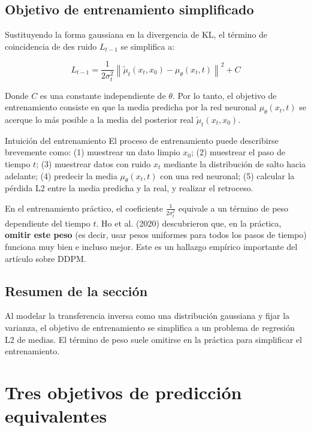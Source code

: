 \documentclass[a4paper]{article}
\begin{document}
\subsection{Objetivo de entrenamiento simplificado}

Sustituyendo la forma gaussiana en la divergencia de KL, el término de coincidencia de des ruido $L_{t-1}$ se simplifica a:

$$L_{t-1} = \frac{1}{2\sigma_t^2} \left\| \tilde{\mu}_t(x_t, x_0) - \mu_\theta(x_t, t) \right\|^2 + C$$

Donde $C$ es una constante independiente de $\theta$. Por lo tanto, el objetivo de entrenamiento consiste en que la media predicha por la red neuronal $\mu_\theta(x_t, t)$ se acerque lo más posible a la media del posterior real $\tilde{\mu}_t(x_t, x_0)$.

\begin{importantbox}{Intuición del entrenamiento}
El proceso de entrenamiento puede describirse brevemente como: (1) muestrear un dato limpio $x_0$; (2) muestrear el paso de tiempo $t$; (3) muestrear datos con ruido $x_t$ mediante la distribución de salto hacia adelante; (4) predecir la media $\mu_\theta(x_t, t)$ con una red neuronal; (5) calcular la pérdida L2 entre la media predicha y la real, y realizar el retroceso.
\end{importantbox}

En el entrenamiento práctico, el coeficiente $\frac{1}{2\sigma_t^2}$ equivale a un término de peso dependiente del tiempo $t$. Ho et al. (2020) descubrieron que, en la práctica, \textbf{omitir este peso} (es decir, usar pesos uniformes para todos los pasos de tiempo) funciona muy bien e incluso mejor. Este es un hallazgo empírico importante del artículo sobre DDPM.

\subsection{Resumen de la sección}

Al modelar la transferencia inversa como una distribución gaussiana y fijar la varianza, el objetivo de entrenamiento se simplifica a un problema de regresión L2 de medias. El término de peso suele omitirse en la práctica para simplificar el entrenamiento.



\section{Tres objetivos de predicción equivalentes}
\end{document}
